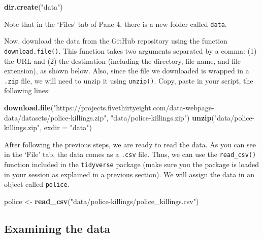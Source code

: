 \documentclass[
]{book}
\newenvironment{Shaded}{\begin{snugshade}}{\end{snugshade}}
\newcommand{\AttributeTok}[1]{\textcolor[rgb]{0.13,0.29,0.53}{#1}}
\newcommand{\FunctionTok}[1]{\textcolor[rgb]{0.13,0.29,0.53}{\textbf{#1}}}
\newcommand{\NormalTok}[1]{#1}
\newcommand{\OtherTok}[1]{\textcolor[rgb]{0.56,0.35,0.01}{#1}}
\newcommand{\StringTok}[1]{\textcolor[rgb]{0.31,0.60,0.02}{#1}}
\begin{document}
\begin{Shaded}
\begin{Highlighting}[]
\FunctionTok{dir.create}\NormalTok{(}\StringTok{"data"}\NormalTok{)}
\end{Highlighting}
\end{Shaded}

Note that in the `Files' tab of Pane 4, there is a new folder called \texttt{data}.

Now, download the data from the GitHub repository using the function \texttt{download.file()}. This function takes two arguments separated by a comma: (1) the URL and (2) the destination (including the directory, file name, and file extension), as shown below. Also, since the file we downloaded is wrapped in a \texttt{.zip} file, we will need to unzip it using \texttt{unzip()}. Copy, paste in your script, the following lines:

\begin{Shaded}
\begin{Highlighting}[]
\FunctionTok{download.file}\NormalTok{(}\StringTok{"https://projects.fivethirtyeight.com/data{-}webpage{-}data/datasets/police{-}killings.zip"}\NormalTok{,}
              \StringTok{"data/police{-}killings.zip"}\NormalTok{)}
\FunctionTok{unzip}\NormalTok{(}\StringTok{"data/police{-}killings.zip"}\NormalTok{, }\AttributeTok{exdir =} \StringTok{"data"}\NormalTok{)}
\end{Highlighting}
\end{Shaded}

After following the previous steps, we are ready to read the data. As you can see in the `File' tab, the data comes as a \texttt{.csv} file. Thus, we can use the \texttt{read\_csv()} function included in the \texttt{tidyverse} package (make sure you the package is loaded in your session as explained in a \protect\hyperlink{installing-packages}{previous section}). We will assign the data in an object called \texttt{police}.

\begin{Shaded}
\begin{Highlighting}[]
\NormalTok{police }\OtherTok{\textless{}{-}} \FunctionTok{read\_csv}\NormalTok{(}\StringTok{"data/police{-}killings/police\_killings.csv"}\NormalTok{)}
\end{Highlighting}
\end{Shaded}

\hypertarget{examining-the-data}{%
\subsection{Examining the data}\label{examining-the-data}}
\end{document}
